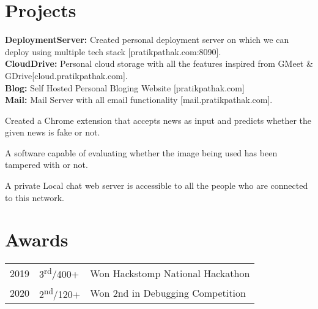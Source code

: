 \documentclass[]{Resume}
\begin{document}
\begin{minipage}[t]{0.66\textwidth}

\section{Projects}
\location{}
\textbf{DeploymentServer:} Created personal deployment server on which we can deploy using multiple tech stack [pratikpathak.com:8090].\\
\textbf{CloudDrive:} Personal cloud storage with all the features inspired from GMeet \& GDrive[cloud.pratikpathak.com].\\
\textbf{Blog:} Self Hosted Personal Bloging Website [pratikpathak.com]\\
\textbf{Mail:} Mail Server with all email functionality [mail.pratikpathak.com].
\sectionsep

\location{}
Created a Chrome extension that accepts news as input and predicts whether the given news is fake or not.
\sectionsep

\location{}
A software capable of evaluating whether the image being used has been tampered with or not.
\sectionsep

\location{}
A private Local chat web server is accessible to all the people who are connected to this network.
\sectionsep


\section{Awards} 
\begin{tabular}{rll}
2019	     & 3\textsuperscript{rd}/400+   & Won Hackstomp National Hackathon\\
2020	     & 2\textsuperscript{nd}/120+   & Won 2nd in Debugging Competition\\
\end{tabular}
\sectionsep

\end{minipage} 
\end{document}
